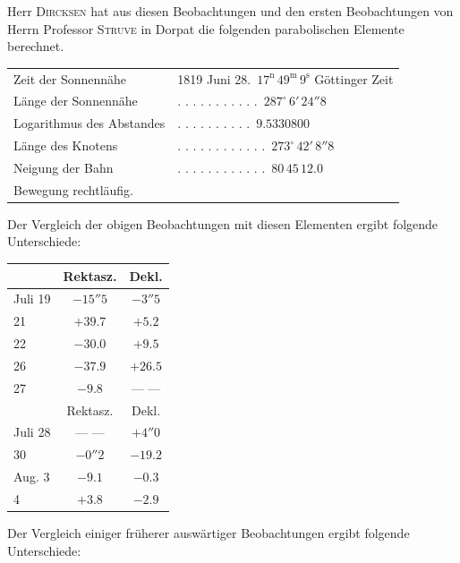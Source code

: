 \par\indent Herr \textsc{Dircksen} hat aus diesen Beobachtungen und den ersten Beobachtungen von Herrn Professor \textsc{Struve} in Dorpat die folgenden parabolischen Elemente berechnet.

\begin{center}
\begin{tabular}{ll}
Zeit der Sonnennähe & 1819 Juni 28.\ $17^{\mathrm n}\,49^{\mathrm m}\,9^{\mathrm s}$ Göttinger Zeit \\
Länge der Sonnennähe & . . . . . . . . . . .\ $287^\circ\,6'\,24''8$ \\
Logarithmus des Abstandes & . . . . . . . . . .\ $9.5330800$ \\
Länge des Knotens & . . . . . . . . . . . .\ $273^\circ\,42'\,8''8$ \\
Neigung der Bahn & . . . . . . . . . . . .\ $80\,45\,12.0$ \\
\multicolumn{2}{l}{Bewegung rechtläufig.}
\end{tabular}
\end{center}

\par\indent Der Vergleich der obigen Beobachtungen mit diesen Elementen ergibt folgende Unterschiede:

\begin{center}
\begin{tabular}{l|c|c}
 &  Rektasz.  &  Dekl.  \\
\hline
Juli 19  &  $-15''5$  &  $-3''5$  \\
21  &  $+39.7$  &  $+5.2$  \\
22  &  $-30.0$  &  $+9.5$  \\
26  &  $-37.9$  &  $+26.5$  \\
27  &  $-9.8$  &  --- ---  \\
\hline
  &  Rektasz.  &  Dekl.  \\
\hline
 Juli 28  &  --- ---  &  $+4''0$  \\
 30  &  $-0''2$  &  $-19.2$  \\
 Aug. 3  &  $-9.1$  &  $-0.3$  \\
 4  &  $+3.8$  &  $-2.9$  \\
\end{tabular}
\end{center}

\par\indent Der Vergleich einiger früherer auswärtiger Beobachtungen ergibt folgende Unterschiede:


